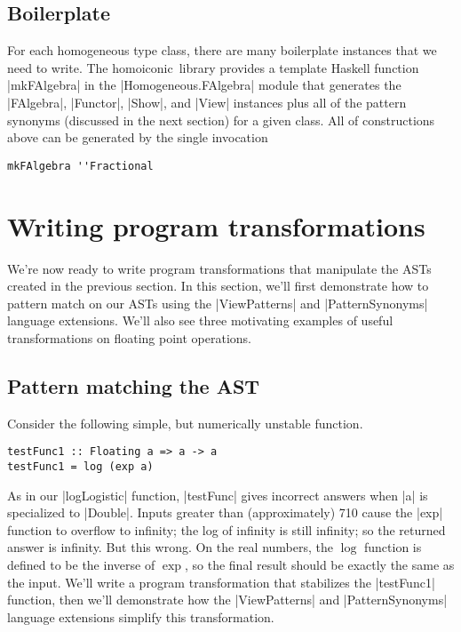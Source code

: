 \documentclass[preprint]{sigplanconf}
\theoremstyle{definition}
\newcommand{\homoiconic}{{\ttfamily homoiconic}~}
\begin{document}
\subsection{Boilerplate}

For each homogeneous type class,
there are many boilerplate instances that we need to write.
The \homoiconic library provides a template Haskell function |mkFAlgebra| in the |Homogeneous.FAlgebra| module that generates the |FAlgebra|, |Functor|, |Show|, and |View| instances plus all of the pattern synonyms (discussed in the next section) for a given class.
All of constructions above can be generated by the single invocation
\begin{lstlisting}
mkFAlgebra ''Fractional
\end{lstlisting}


\section{Writing program transformations}
\label{sec:stabilize}

We're now ready to write program transformations that manipulate the ASTs created in the previous section.
In this section, we'll first demonstrate how to pattern match on our ASTs using the |ViewPatterns| and |PatternSynonyms| language extensions.
We'll also see three motivating examples of useful transformations on floating point operations.


\subsection{Pattern matching the AST}
\label{sec:patternmatch}

Consider the following simple,
but numerically unstable function.
\begin{lstlisting}
testFunc1 :: Floating a => a -> a
testFunc1 = log (exp a)
\end{lstlisting}
As in our |logLogistic| function,
|testFunc| gives incorrect answers when |a| is specialized to |Double|.
Inputs greater than (approximately) 710 cause the |exp| function to overflow to infinity;
the log of infinity is still infinity;
so the returned answer is infinity.
But this wrong.
On the real numbers, the $\log$ function is defined to be the inverse of $\exp$,
so the final result should be exactly the same as the input.
We'll write a program transformation that stabilizes the |testFunc1| function,
then we'll demonstrate how the |ViewPatterns| and |PatternSynonyms| language extensions simplify this transformation.
\label{sec:viewpatterns}
\end{document}
